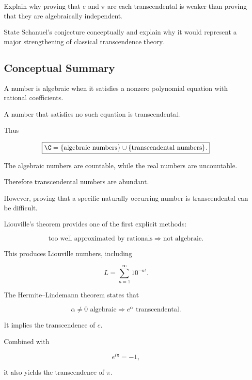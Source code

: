 \begin{exercise}[3]
Explain why proving that \(e\) and \(\pi\) are each transcendental is weaker
than proving that they are algebraically independent.
\end{exercise}

\begin{exercise}[3]
State Schanuel's conjecture conceptually and explain why it would represent a
major strengthening of classical transcendence theory.
\end{exercise}

\subsection{Conceptual Summary}
\label{subsec:transcendental-number-theory-summary}

A number is algebraic when it satisfies a nonzero polynomial equation with
rational coefficients.

A number that satisfies no such equation is transcendental.

Thus

\[
\boxed{
\C=
\{\text{algebraic numbers}\}
\cup
\{\text{transcendental numbers}\}.
}
\]

The algebraic numbers are countable, while the real numbers are uncountable.

Therefore transcendental numbers are abundant.

However, proving that a specific naturally occurring number is
transcendental can be difficult.

Liouville's theorem provides one of the first explicit methods:

\[
\boxed{
\text{too well approximated by rationals}
\Longrightarrow
\text{not algebraic}.
}
\]

This produces Liouville numbers, including

\[ L=\sum_{n=1}^{\infty}10^{-n!}. \]

The Hermite--Lindemann theorem states that

\[ \boxed{\alpha\neq0\text{ algebraic}\Longrightarrow e^\alpha
\text{ transcendental}.} \]

It implies the transcendence of \(e\).

Combined with

\[ e^{i\pi}=-1, \]

it also yields the transcendence of \(\pi\).

